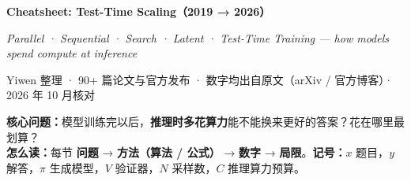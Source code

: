 \documentclass[8pt]{extarticle}
\begin{document}
\begin{tcolorbox}[enhanced,colback=cblue!5,colframe=cblue!40,boxrule=0.6pt,arc=2pt,left=7pt,right=7pt,top=4pt,bottom=4pt]
\begin{minipage}[t]{0.56\linewidth}
{\fontsize{17}{21}\selectfont\bfseries Cheatsheet: Test-Time Scaling（2019 → 2026）}\par\vspace{2pt}
{\itshape\color{cgray} Parallel · Sequential · Search · Latent · Test-Time Training — how models spend compute at inference}\par
{\small\color{cgray} Yiwen 整理 · 90+ 篇论文与官方发布 · 数字均出自原文（arXiv / 官方博客）· 2026 年 10 月核对}
\end{minipage}\hfill
\begin{minipage}[t]{0.42\linewidth}\small
\textbf{核心问题：}模型训练完以后，\textbf{推理时多花算力}能不能换来更好的答案？花在哪里最划算？\\
\textbf{怎么读：}每节 \textbf{\color{cred}问题} → \textbf{\color{cblue}方法（算法 / 公式）} → \textbf{数字} → \textbf{\color{corange}局限}。\textbf{记号：}$x$ 题目，$y$ 解答，$\pi$ 生成模型，$V$ 验证器，$N$ 采样数，$C$ 推理算力预算。
\end{minipage}
\end{tcolorbox}
\end{document}
